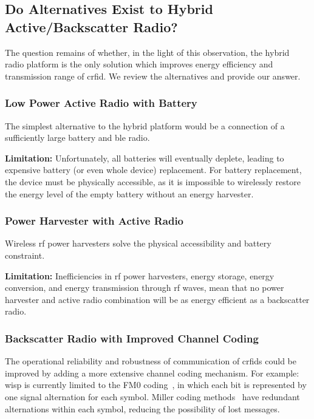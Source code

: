 \documentclass[conference,letterpaper,twoside,final,10pt]{IEEEtran}
\begin{document}
\subsection{Do Alternatives Exist to Hybrid Active/Backscatter Radio?}
\label{sec:motivation/alternatives}

The question remains of whether, in the light of this observation, the hybrid radio platform is the only solution which improves energy efficiency and transmission range of \ac{crfid}. We review the alternatives and provide our answer.

\subsubsection{Low Power Active Radio with Battery}
\label{sec:alternatives/blebatt}

The simplest alternative to the hybrid platform would be a connection of a sufficiently large battery and \ac{ble} radio.

\textbf{Limitation:}
Unfortunately, all batteries will eventually deplete, leading to expensive battery (or even whole device) replacement.
For battery replacement, the device must be physically accessible, as it is impossible to wirelessly restore the energy level of the empty battery without an energy harvester.

\subsubsection{Power Harvester with Active Radio}
\label{sec:alternatives/harvester}

Wireless \ac{rf} power harvesters solve the physical accessibility and battery constraint.

\textbf{Limitation:}
Inefficiencies in \ac{rf} power harvesters, energy storage, energy conversion, and energy transmission through \ac{rf} waves, mean that no power harvester and active radio combination will be as energy efficient as a backscatter radio.

\subsubsection{Backscatter Radio with Improved Channel Coding}
\label{sec:alternatives/coding}

The operational reliability and robustness of communication of \acp{crfid} could be improved by adding a more extensive channel coding mechanism.
For example: \ac{wisp} is currently limited to the FM0 coding~\cite[Sec. 6.3.1.3.2.1]{epcglobal2013gen2}, in which each bit is represented by one signal alternation for each symbol.
Miller coding methods~\cite[Sec. 6.3.1.3.2.3]{epcglobal2013gen2} have redundant alternations within each symbol, reducing the possibility of lost messages.
\end{document}
